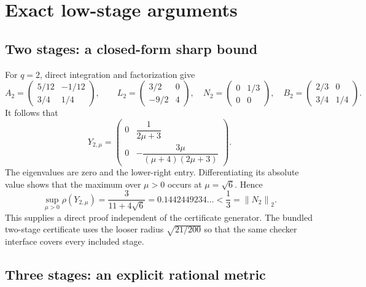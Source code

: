 \documentclass[11pt,letterpaper]{article}
\theoremstyle{remark}
\newcommand{\norm}[1]{\left\|#1\right\|_2}
\begin{document}
\section{Exact low-stage arguments}

\subsection{Two stages: a closed-form sharp bound}

For \(q=2\), direct integration and factorization give
\[
 A_2=\begin{pmatrix}5/12&-1/12\\3/4&1/4\end{pmatrix},\qquad
 L_2=\begin{pmatrix}3/2&0\\-9/2&4\end{pmatrix},\quad
 N_2=\begin{pmatrix}0&1/3\\0&0\end{pmatrix},\quad
 B_2=\begin{pmatrix}2/3&0\\3/4&1/4\end{pmatrix}.
\]
It follows that
\[
 Y_{2,\mu}=\begin{pmatrix}
 0&\dfrac1{2\mu+3}\\[5pt]
 0&-\dfrac{3\mu}{(\mu+4)(2\mu+3)}
 \end{pmatrix}.
\]
The eigenvalues are zero and the lower-right entry. Differentiating its
absolute value shows that the maximum over \(\mu>0\) occurs at
\(\mu=\sqrt6\). Hence
\begin{equation}\label{eq:q2}
 \sup_{\mu>0}\rho(Y_{2,\mu})
 =\frac3{11+4\sqrt6}=0.1442449234\ldots <\frac13=\norm{N_2}.
\end{equation}
This supplies a direct proof independent of the certificate generator.
The bundled two-stage certificate uses the looser radius \(\sqrt{21/200}\)
so that the same checker interface covers every included stage.

\subsection{Three stages: an explicit rational metric}
\end{document}
